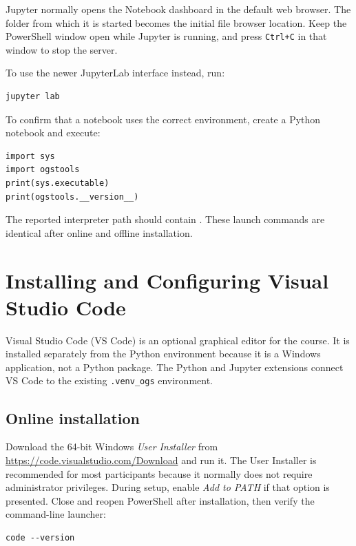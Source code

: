 \documentclass[11pt,a4paper]{tubaf-report}
\begin{document}
Jupyter normally opens the Notebook dashboard in the default web browser. The
folder from which it is started becomes the initial file browser location. Keep
the PowerShell window open while Jupyter is running, and press
\texttt{Ctrl+C} in that window to stop the server.

To use the newer JupyterLab interface instead, run:

\begin{lstlisting}[style=terminal]
jupyter lab
\end{lstlisting}

To confirm that a notebook uses the correct environment, create a Python
notebook and execute:

\begin{lstlisting}[style=terminal]
import sys
import ogstools
print(sys.executable)
print(ogstools.__version__)
\end{lstlisting}

The reported interpreter path should contain
. These launch commands
are identical after online and offline installation.


\section{Installing and Configuring Visual Studio Code}
\label{subsec:windows-vscode}

Visual Studio Code (VS Code) is an optional graphical editor for the course.
It is installed separately from the Python environment because it is a Windows
application, not a Python package. The Python and Jupyter extensions connect
VS Code to the existing \texttt{.venv\_ogs} environment.

\subsection{Online installation}

Download the 64-bit Windows \emph{User Installer} from
\url{https://code.visualstudio.com/Download} and run it. The User Installer is
recommended for most participants because it normally does not require
administrator privileges. During setup, enable \emph{Add to PATH} if that
option is presented. Close and reopen PowerShell after installation, then
verify the command-line launcher:

\begin{lstlisting}[style=terminal]
code --version
\end{lstlisting}
\end{document}
